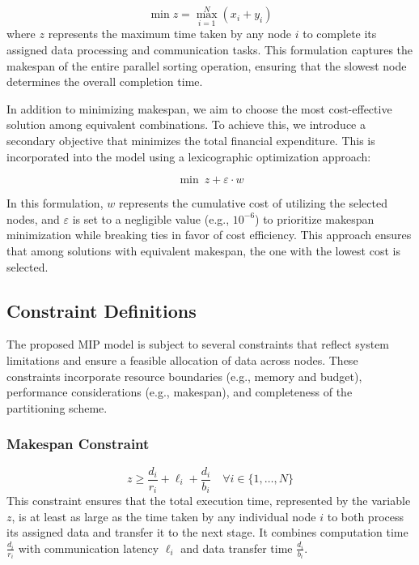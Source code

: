 \documentclass[]{interact}
\theoremstyle{plain}
\theoremstyle{definition}
\theoremstyle{remark}
\begin{document}
\begin{equation}
    \min z = \max_{i=1}^N (x_i + y_i)
\end{equation}
where $z$ represents the maximum time taken by any node $i$ to complete its assigned data processing and communication tasks. This formulation captures the makespan of the entire parallel sorting operation, ensuring that the slowest node determines the overall completion time.

In addition to minimizing makespan, we aim to choose the most cost-effective solution among equivalent combinations. To achieve this, we introduce a secondary objective that minimizes the total financial expenditure. This is incorporated into the model using a lexicographic optimization approach:

\begin{equation}
    \min \ z + \varepsilon \cdot w
\end{equation}

In this formulation, $w$ represents the cumulative cost of utilizing the selected nodes, and $\varepsilon$ is set to a negligible value (e.g., $10^{-6}$) to prioritize makespan minimization while breaking ties in favor of cost efficiency. This approach ensures that among solutions with equivalent makespan, the one with the lowest cost is selected.

\subsection{Constraint Definitions}

The proposed MIP model is subject to several constraints that reflect system limitations and ensure a feasible allocation of data across nodes. These constraints incorporate resource boundaries (e.g., memory and budget), performance considerations (e.g., makespan), and completeness of the partitioning scheme.

\subsubsection{Makespan Constraint}
\begin{equation}
    z \geq \frac{d_i}{r_i} + \ell_i + \frac{d_i}{b_i} \quad \forall i \in \{1, \ldots, N\}
\end{equation}
This constraint ensures that the total execution time, represented by the variable $z$, is at least as large as the time taken by any individual node $i$ to both process its assigned data and transfer it to the next stage. It combines computation time $\frac{d_i}{r_i}$ with communication latency $\ell_i$ and data transfer time $\frac{d_i}{b_i}$.
\end{document}
